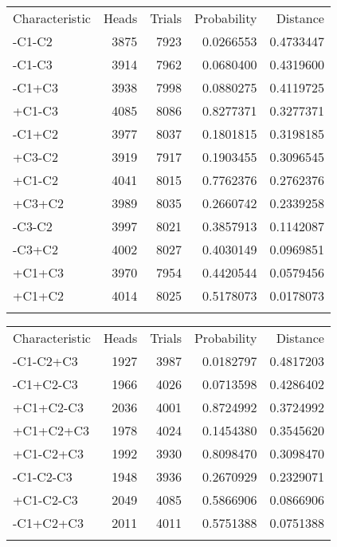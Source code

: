 \documentclass[
  ignorenonframetext,
]{beamer}
\renewcommand{\,}{\text{, }}
\begin{document}
\begin{frame}
\small

\begin{longtable}[]{@{}lrrrr@{}}
\toprule
Characteristic & Heads & Trials & Probability &
Distance \\ \addlinespace
\midrule
\endhead
-C1-C2 & 3875 & 7923 & 0.0266553 & 0.4733447 \\ \addlinespace
-C1-C3 & 3914 & 7962 & 0.0680400 & 0.4319600 \\ \addlinespace
-C1+C3 & 3938 & 7998 & 0.0880275 & 0.4119725 \\ \addlinespace
+C1-C3 & 4085 & 8086 & 0.8277371 & 0.3277371 \\ \addlinespace
-C1+C2 & 3977 & 8037 & 0.1801815 & 0.3198185 \\ \addlinespace
+C3-C2 & 3919 & 7917 & 0.1903455 & 0.3096545 \\ \addlinespace
+C1-C2 & 4041 & 8015 & 0.7762376 & 0.2762376 \\ \addlinespace
+C3+C2 & 3989 & 8035 & 0.2660742 & 0.2339258 \\ \addlinespace
-C3-C2 & 3997 & 8021 & 0.3857913 & 0.1142087 \\ \addlinespace
-C3+C2 & 4002 & 8027 & 0.4030149 & 0.0969851 \\ \addlinespace
+C1+C3 & 3970 & 7954 & 0.4420544 & 0.0579456 \\ \addlinespace
+C1+C2 & 4014 & 8025 & 0.5178073 & 0.0178073 \\ \addlinespace
\bottomrule
\end{longtable}
\end{frame}

\begin{frame}
\small

\begin{longtable}[]{@{}lrrrr@{}}
\toprule
Characteristic & Heads & Trials & Probability &
Distance \\ \addlinespace
\midrule
\endhead
-C1-C2+C3 & 1927 & 3987 & 0.0182797 & 0.4817203 \\ \addlinespace
-C1+C2-C3 & 1966 & 4026 & 0.0713598 & 0.4286402 \\ \addlinespace
+C1+C2-C3 & 2036 & 4001 & 0.8724992 & 0.3724992 \\ \addlinespace
+C1+C2+C3 & 1978 & 4024 & 0.1454380 & 0.3545620 \\ \addlinespace
+C1-C2+C3 & 1992 & 3930 & 0.8098470 & 0.3098470 \\ \addlinespace
-C1-C2-C3 & 1948 & 3936 & 0.2670929 & 0.2329071 \\ \addlinespace
+C1-C2-C3 & 2049 & 4085 & 0.5866906 & 0.0866906 \\ \addlinespace
-C1+C2+C3 & 2011 & 4011 & 0.5751388 & 0.0751388 \\ \addlinespace
\bottomrule
\end{longtable}
\end{frame}
\end{document}
